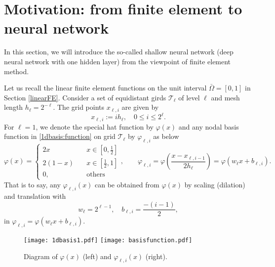 \section{Motivation: from finite element to neural network}\label{FE2NN}
In this section, we will introduce the so-called shallow neural network 
(deep neural network with one hidden layer) from the viewpoint of finite element method.

Let us recall the linear finite element functions on the unit interval $\bar{\Omega}=[0,1]$ in Section \ref{linearFE}. 
Consider a set of equidistant girds $\mathcal T_\ell$ of level $\ell$ and mesh length $h_\ell = 2^{-\ell}$. The grid points $x_{\ell,i}$ are given by
\begin{equation}
x_{\ell,i}:=ih_\ell,\quad 0\le i\le 2^\ell.
\end{equation} 
For $\ell=1$, we denote the special hat function by $\varphi(x)$ and any nodal basis function in \eqref{1dbasis:function} on grid $\mathcal T_\ell$ by $\varphi_{\ell,i} $ as below
\begin{equation}\label{def_g}
\varphi(x) = 
\begin{cases}
2x \quad &x\in [0,\frac{1}{2}] \\
2(1-x) \quad &x\in [\frac{1}{2}, 1] \\
0, \quad &\text{others} 
\end{cases},\qquad
\varphi_{\ell,i} = \varphi(\frac{x - x_{\ell,i-1}}{2h_\ell}) = \varphi(w_\ell x + b_{\ell,i}).
\end{equation} 
That is to say, any $\varphi_{\ell,i}(x)$ can be obtained from $\varphi(x)$ by scaling 
(dilation) and translation with 
\begin{equation}\label{key}
w_\ell = 2^{\ell-1}, \quad b_{\ell,i} = \frac{-(i-1)}{2},
\end{equation}
in $\varphi_{\ell,i} = \varphi(w_\ell x + b_{\ell,i})$. 
\begin{figure}[H]
\centering
\texttt{[image: 1dbasis1.pdf]}\qquad
\texttt{[image: basisfunction.pdf]}
\caption{Diagram of $\varphi(x)$ (left) and $\varphi_{\ell,i}(x)$ (right).}
\end{figure} 


